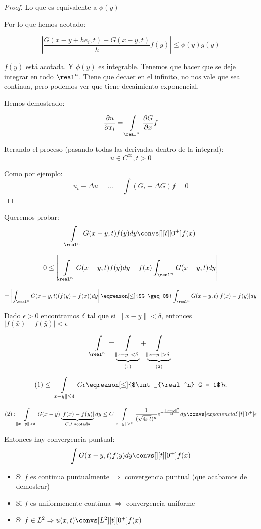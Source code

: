 \begin{proof}
			Lo que es equivalente a $\phi(y)$

			Por lo que hemos acotado:

			\[ \left| \frac{G(x-y+he_i,t) - G(x-y,t)}{h} f(y) \right| \leq \phi(y) g(y) \]

			$f(y)$ está acotada. Y $\phi(y)$ es integrable. Tenemos que hacer que se deje integrar en todo $\real^n$. Tiene que decaer en el infinito, no nos vale que sea continua, pero podemos ver que tiene decaimiento exponencial.

			Hemos demostrado:

			\[ \frac{\partial u}{\partial x_i} = \int\limits_{\real^n}\frac{\partial G}{\partial x} f\]

			Iterando el proceso (pasando todas las derivadas dentro de la integral):
			\[ u \in C^\infty, t> 0\]

			Como por ejemplo:
			\[ u_t - \Delta u = … = \int(G_t- \Delta G) f = 0\]


		\end{proof}

		\begin{example}

			Queremos probar:
			\[ \int\limits_{\real^n} G(x-y,t) f(y) dy \convs[][t][0^+] f(x)\]

			\[ 0 \leq \left| \int\limits_{\real^n} G(x-y,t) f(y) dy - f(x) \int_{\real^n} G(x-y,t) dy \right|\]

			\[ = \left| \int_{\real^n} G(x-y,t) (f(y)-f(x))dy \right| \eqreason[\leq]{$G \geq 0$} \int_{\real^n} G(x-y,t) |f(x) - f(y)| dy \]

			Dado $\epsilon > 0$ encontramos $\delta$ tal que si $\|x-y\| < \delta$, entonces $|f(\bar{x})-f(\bar{y})| < \epsilon$

			\[ \int\limits_{\real^n} = \underbrace{\int\limits_{\|x-y\| < \delta}}_{(1)} + \underbrace{\int\limits_{\|x-y\|>\delta}}_{(2)}\]

			\[ (1) \leq \int\limits_{\|x-y\|\leq \delta} G \epsilon \eqreason[\leq]{$\int_{\real^n} G = 1$} \epsilon\]

			\[ (2): \int\limits_{\|x-y\|>\delta} G(x-y) \underbrace{| f(x) - f(y) |}_{C,f \text{ acotada}} dy \leq C \int\limits_{\|x-y\| > \delta} \frac{1}{(\sqrt{4\pi t})^n} e^{-\frac{\|x-y\|^2}{4t}} dy \convs[exponencial][t][0^+] \epsilon\]

			Entonces hay convergencia puntual:
			\[\int G(x-y,t) f(y) dy \convs[][t][0^+] f(x)\]

		\end{example}

		\obs
				\begin{itemize}
					\item Si $f$ es continua puntualmente $\Rightarrow$ convergencia puntual (que acabamos de demostrar)
					\item Si $f$ es uniformenente contínua $\Rightarrow$ convergencia uniforme
					\item Si $f \in L^2 \Rightarrow u(x,t) \convs[L^2][t][0^+] f(x)$
				\end{itemize}



